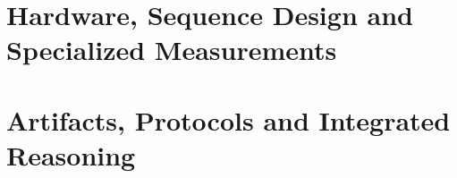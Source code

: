 \documentclass[a4paper,10pt,twoside,openany]{book}
\begin{document}
\part{Hardware, Sequence Design and Specialized Measurements}






\part{Artifacts, Protocols and Integrated Reasoning}







\printbibliography[heading=bibintoc,title={References}]
\appendix






\cleardoublepage
{}
{}
\printindex

\end{document}
